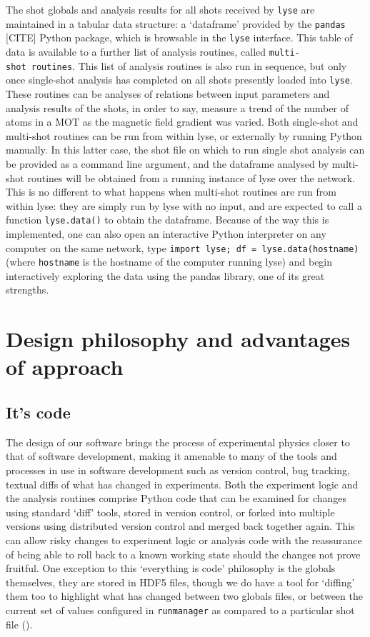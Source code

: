The shot globals and analysis results for all shots received by \texttt{lyse} are maintained in a tabular data structure: a `dataframe' provided by the \texttt{pandas} [CITE] Python package, which is browsable in the \texttt{lyse} interface. This table of data is available to a further list of analysis routines, called \texttt{multi-shot\ routines}. This list of analysis routines is also run in sequence, but only once single-shot analysis has completed on all shots presently loaded into \texttt{lyse}. These routines can be analyses of relations between input parameters and analysis results of the shots, in order to say, measure a trend of the number of atoms in a MOT as the magnetic field gradient was varied. Both single-shot and multi-shot routines can be run from within lyse, or externally by running Python manually. In this latter case, the shot file on which to run single shot analysis can be provided as a command line argument, and the dataframe analysed by multi-shot routines will be obtained from a running instance of lyse over the network. This is no different to what happens when multi-shot routines are run from within lyse: they are simply run by lyse with no input, and are expected to call a function \texttt{lyse.data()} to obtain the dataframe. Because of the way this is implemented, one can also open an interactive Python interpreter on any computer on the same network, type \texttt{import lyse; df = lyse.data(hostname)} (where \texttt{hostname} is the hostname of the computer running lyse) and begin interactively exploring the data using the pandas library, one of its great strengths.

\section{Design philosophy and advantages of approach}

\subsection{It's code}
The design of our software brings the process of experimental physics closer to that of software development, making it amenable to many of the tools and processes in use in software development such as version control, bug tracking, textual diffs of what has changed in experiments. Both the experiment logic and the analysis routines comprise Python code that can be examined for changes using standard `diff' tools, stored in version control, or forked into multiple versions using distributed version control and merged back together again. This can allow risky changes to experiment logic or analysis code with the reassurance of being able to roll back to a known working state should the changes not prove fruitful. One exception to this `everything is code' philosophy is the globals themselves, they are stored in HDF5 files, though we do have a tool for `diffing' them too to highlight what has changed between two globals files, or between the current set of values configured in \texttt{runmanager} as compared to a particular shot file ().


